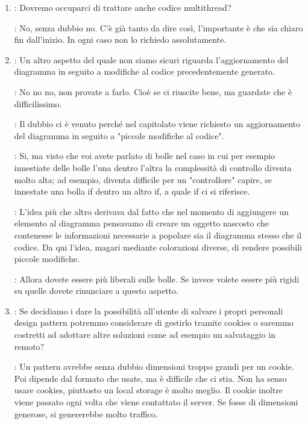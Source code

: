 \documentclass[../AnalisiDeiRequisiti.tex]{subfiles}
\begin{document}
\begin{enumerate}
		\item
		\kaleidoscode: Dovremo occuparci di trattare anche codice multithread?

		\proponente: No, senza dubbio no. C'è già tanto da dire così, l'importante è che sia
		chiaro fin dall'inizio. In ogni caso non lo richiedo assolutamente.
	
		\item
		\kaleidoscode: Un altro aspetto del quale non siamo sicuri riguarda l'aggiornamento
		del diagramma in seguito a modifiche al codice precedentemente generato.

		\proponente: No no no, non provate a farlo. Cioè se ci riuscite bene, ma guardate che
		è difficilissimo.

		\kaleidoscode: Il dubbio ci è venuto perché nel capitolato viene richiesto un
		aggiornamento del diagramma in seguito a "piccole modifiche al codice".
		
		\proponente: Si, ma visto che voi avete parlato di bolle nel caso in cui per esempio
		innestiate delle bolle l'una dentro l'altra la complessità di controllo diventa
		molto alta; ad esempio, diventa difficile per un "controllore" capire, se innestate una
		bolla if dentro un altro if, a quale if ci si riferisce.

		\kaleidoscode: L'idea più che altro derivava dal fatto che nel momento di aggiungere
		un elemento al diagramma pensavamo di creare un oggetto nascosto che contenesse le
		informazioni necessarie a popolare sia il diagramma stesso che il codice. Da qui
		l'idea, magari mediante colorazioni diverse, di rendere possibili piccole
		modifiche.
		
		\proponente: Allora dovete essere più liberali sulle bolle. Se invece volete essere
		più rigidi su quelle dovete rinunciare a questo aspetto.

		\item
		\kaleidoscode: Se decidiamo i dare la possibilità all'utente di
		salvare i propri personali design pattern potremmo considerare di gestirlo tramite
		cookies o saremmo costretti ad adottare altre soluzioni come ad esempio un
		salvataggio in remoto?

		\proponente: Un pattern avrebbe senza dubbio dimensioni troppo
		grandi per un cookie. Poi dipende dal formato che usate, ma è difficile che ci
		stia. Non ha senso usare cookies, piuttosto un local storage è
		molto meglio. Il cookie inoltre viene passato ogni volta che viene contattato
		il server. Se fosse di dimensioni generose, si genererebbe molto traffico.
		

\end{enumerate}
\end{document}
